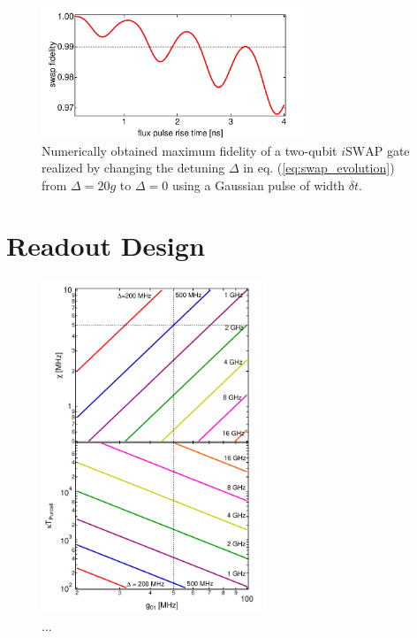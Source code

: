 \begin{figure}
	\centering
	\includegraphics[width=0.7\textwidth]{./material/mathematica/qubit_qubit_swap_error}
	\caption[]{Numerically obtained maximum fidelity of a two-qubit $i\mathrm{SWAP}$ gate realized by changing the detuning $\Delta$ in eq. (\ref{eq:swap_evolution}) from $\Delta = 20g$ to $\Delta=0$ using a Gaussian pulse of width $\delta t$.}
	\label{fig:qubit_qubit_coupling_swap_error}
\end{figure}


\section{Readout Design}

\begin{figure}
	\includegraphics[width=0.6\textwidth]{./material/mathematica/readout_purcell_and_chi_vs_g}
	\caption[]{...}
	\label{fig:purcell_rate_and_chi}
\end{figure}

